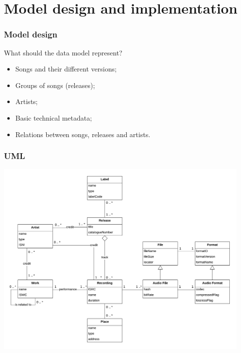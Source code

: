\documentclass{beamer}
\begin{document}
\section{Model design and implementation}


  \begin{frame}
    \frametitle{Model design}

    What should the data model represent?

    \vspace{1em}

    \begin{itemize}
      \itemsep0.75em
      \item Songs and their different versions;
      \item Groups of songs (releases);
      \item Artists;
      \item Basic technical metadata;
      \item Relations between songs, releases and artists.
    \end{itemize}

  \end{frame}



  \begin{frame}
    \frametitle{UML}
    \begin{center}
      \includegraphics[width=0.95\textwidth]{img/UML.pdf}
    \end{center}
  \end{frame}
\end{document}
